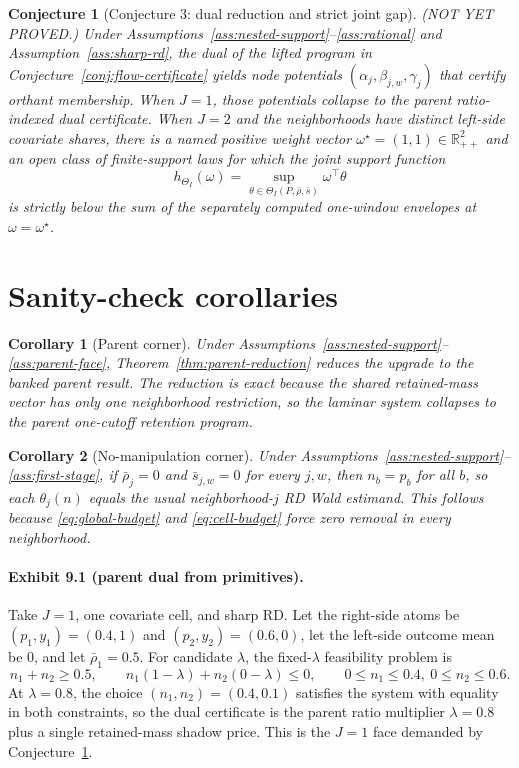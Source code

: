 \documentclass[11pt]{article}
\newcommand{\R}{\mathbb{R}}
\theoremstyle{definition}
\theoremstyle{plain}
\newtheorem{conjecture}{Conjecture}
\newtheorem{corollary}{Corollary}
\theoremstyle{remark}
\begin{document}
\begin{conjecture}[Conjecture 3: dual reduction and strict joint gap]\label{conj:dual-gap}
(NOT YET PROVED.)  Under Assumptions~\ref{ass:nested-support}--\ref{ass:rational} and
Assumption~\ref{ass:sharp-rd}, the dual of the lifted program in
Conjecture~\ref{conj:flow-certificate} yields node potentials
\((\alpha_j,\beta_{j,w},\gamma_j)\) that certify orthant membership.  When \(J=1\), those
potentials collapse to the parent ratio-indexed dual certificate.  When \(J=2\) and the
neighborhoods have distinct left-side covariate shares, there is a named positive weight vector
\(\omega^\star=(1,1)\in\R_{++}^2\) and an open class of finite-support laws for which the joint
support function
\[
  h_{\Theta_I}(\omega)=\sup_{\theta\in\Theta_I(P,\bar\rho,\bar s)} \omega^\top \theta
\]
is strictly below the sum of the separately computed one-window envelopes at
\(\omega=\omega^\star\).
\end{conjecture}

\section{Sanity-check corollaries}
\begin{corollary}[Parent corner]\label{cor:parent-corner}
Under Assumptions~\ref{ass:nested-support}--\ref{ass:parent-face},
Theorem~\ref{thm:parent-reduction} reduces the upgrade to the banked parent result.  The
reduction is exact because the shared retained-mass vector has only one neighborhood
restriction, so the laminar system collapses to the parent one-cutoff retention program.
\end{corollary}

\begin{corollary}[No-manipulation corner]\label{cor:no-manipulation}
Under Assumptions~\ref{ass:nested-support}--\ref{ass:first-stage}, if \(\bar\rho_j=0\) and
\(\bar s_{j,w}=0\) for every \(j,w\), then \(n_b=p_b\) for all \(b\), so each
\(\theta_j(n)\) equals the usual neighborhood-\(j\) RD Wald estimand.  This follows because
\eqref{eq:global-budget} and \eqref{eq:cell-budget} force zero removal in every neighborhood.
\end{corollary}

\paragraph{Exhibit 9.1 (parent dual from primitives).}
Take \(J=1\), one covariate cell, and sharp RD.  Let the right-side atoms be
\((p_1,y_1)=(0.4,1)\) and \((p_2,y_2)=(0.6,0)\), let the left-side outcome mean be \(0\), and
let \(\bar\rho_1=0.5\).  For candidate \(\lambda\), the fixed-\(\lambda\) feasibility problem is
\[
  n_1+n_2\ge 0.5,\qquad
  n_1(1-\lambda)+n_2(0-\lambda)\le 0,\qquad
  0\le n_1\le 0.4,\ 0\le n_2\le 0.6.
\]
At \(\lambda=0.8\), the choice \((n_1,n_2)=(0.4,0.1)\) satisfies the system with equality in
both constraints, so the dual certificate is the parent ratio multiplier \(\lambda=0.8\) plus a
single retained-mass shadow price.  This is the \(J=1\) face demanded by
Conjecture~\ref{conj:dual-gap}.
\end{document}
